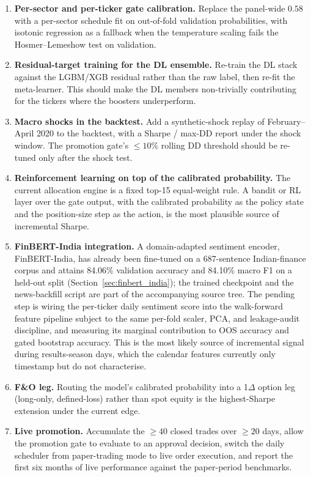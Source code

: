 \begin{enumerate}
    \item \textbf{Per-sector and per-ticker gate calibration.} Replace the panel-wide $0.58$ with a per-sector schedule fit on out-of-fold validation probabilities, with isotonic regression as a fallback when the temperature scaling fails the Hosmer--Lemeshow test on validation.
    \item \textbf{Residual-target training for the DL ensemble.} Re-train the DL stack against the LGBM/XGB residual rather than the raw label, then re-fit the meta-learner. This should make the DL members non-trivially contributing for the tickers where the boosters underperform.
    \item \textbf{Macro shocks in the backtest.} Add a synthetic-shock replay of February--April 2020 to the backtest, with a Sharpe / max-DD report under the shock window. The promotion gate's $\leq 10\%$ rolling DD threshold should be re-tuned only after the shock test.
    \item \textbf{Reinforcement learning on top of the calibrated probability.} The current allocation engine is a fixed top-15 equal-weight rule. A bandit or RL layer over the gate output, with the calibrated probability as the policy state and the position-size step as the action, is the most plausible source of incremental Sharpe.
    \item \textbf{FinBERT-India integration.} A domain-adapted sentiment encoder, FinBERT-India, has already been fine-tuned on a 687-sentence Indian-finance corpus and attains 84.06\% validation accuracy and 84.10\% macro F1 on a held-out split (Section~\ref{sec:finbert_india}); the trained checkpoint and the news-backfill script are part of the accompanying source tree. The pending step is wiring the per-ticker daily sentiment score into the walk-forward feature pipeline subject to the same per-fold scaler, PCA, and leakage-audit discipline, and measuring its marginal contribution to OOS accuracy and gated bootstrap accuracy. This is the most likely source of incremental signal during results-season days, which the calendar features currently only timestamp but do not characterise.
    \item \textbf{F\&O leg.} Routing the model's calibrated probability into a 1$\Delta$ option leg (long-only, defined-loss) rather than spot equity is the highest-Sharpe extension under the current edge.
    \item \textbf{Live promotion.} Accumulate the $\geq 40$ closed trades over $\geq 20$ days, allow the promotion gate to evaluate to an approval decision, switch the daily scheduler from paper-trading mode to live order execution, and report the first six months of live performance against the paper-period benchmarks.
\end{enumerate}

